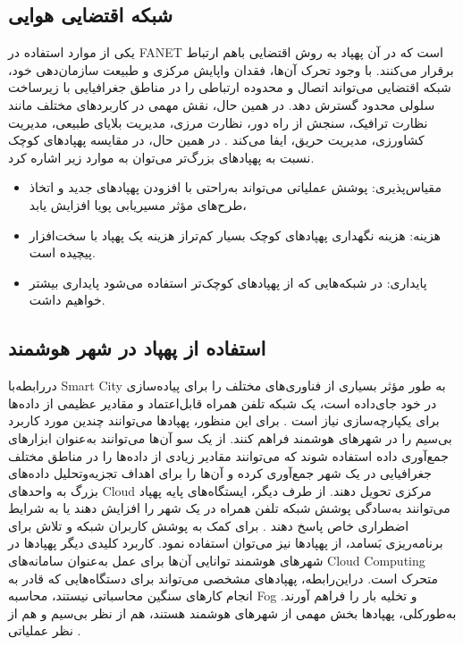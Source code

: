 \subsection{شبکه اقتضایی هوایی}
یکی از موارد استفاده در \gls{FANET} است که در آن پهپاد به روش اقتضایی باهم ارتباط برقرار می‌کنند. با وجود تحرک آن‌ها، فقدان واپایش مرکزی و طبیعت سازمان‌دهی خود، شبکه اقتضایی می‌تواند اتصال و محدوده ارتباطی را در مناطق جغرافیایی با زیرساخت سلولی محدود گسترش دهد\cite{zafar2016flying}. در همین حال،  نقش مهمی در کاربردهای مختلف مانند نظارت ترافیک، سنجش از راه دور، نظارت مرزی، مدیریت بلایای طبیعی، مدیریت کشاورزی، مدیریت حریق، ایفا می‌کند \cite{kundu2024trust}.
در همین حال، در مقایسه پهپادهای کوچک نسبت به پهپادهای بزرگ‌تر می‌توان به موارد زیر اشاره کرد.
\begin{itemize} 
	\item 
	مقیاس‌پذیری: پوشش عملیاتی می‌تواند به‌راحتی با افزودن پهپادهای جدید و اتخاذ طرح‌های مؤثر مسیریابی پویا افزایش یابد، 
	\item 
	هزینه: هزینه نگهداری پهپادهای کوچک بسیار کم‌تراز هزینه یک پهپاد با سخت‌افزار پیچیده است.
	\item 
	پایداری: در شبکه‌هایی که از پهپادهای کوچک‌تر استفاده می‌شود پایداری بیشتر خواهیم داشت.
\end{itemize}
\subsection{استفاده از پهپاد در شهر هوشمند}
دررابطه‌با \gls{Smart City} به طور مؤثر بسیاری از فناوری‌های مختلف را برای پیاده‌سازی در خود جای‌داده است، یک شبکه تلفن همراه قابل‌اعتماد و مقادیر عظیمی از داده‌ها برای یکپارچه‌سازی نیاز است \cite{ferdowsi2017colonel}. برای این منظور، پهپادها می‌توانند چندین مورد کاربرد بی‌سیم را در شهرهای هوشمند فراهم کنند. از یک سو آن‌ها می‌توانند به‌عنوان ابزارهای جمع‌آوری داده استفاده شوند که می‌توانند مقادیر زیادی از داده‌ها را در مناطق مختلف جغرافیایی در یک شهر جمع‌آوری کرده و آن‌ها را برای اهداف تجزیه‌وتحلیل داده‌های بزرگ به واحدهای \gls{Cloud} مرکزی تحویل دهند. از طرف دیگر، ایستگاه‌های پایه پهپاد می‌توانند به‌سادگی پوشش شبکه تلفن همراه در یک شهر را افزایش دهند یا به شرایط اضطراری خاص پاسخ دهند \cite{app13179881,drones7020079}.
برای کمک به پوشش کاربران شبکه و تلاش برای برنامه‌ریزی بَسامد، از پهپادها نیز می‌توان استفاده نمود. کاربرد کلیدی دیگر پهپادها در شهرهای هوشمند توانایی آن‌ها برای عمل به‌عنوان سامانه‌های \gls{Cloud Computing} متحرک است\cite{jeong2017mobile}. دراین‌رابطه، پهپادهای مشخصی می‌تواند برای دستگاه‌هایی که قادر به انجام کارهای سنگین محاسباتی نیستند، محاسبه \gls{Fog} و تخلیه بار را فراهم آورند. به‌طورکلی، پهپادها بخش مهمی از شهرهای هوشمند هستند، هم از نظر بی‌سیم و هم از نظر عملیاتی \cite{Siddiqi,8675178}.
